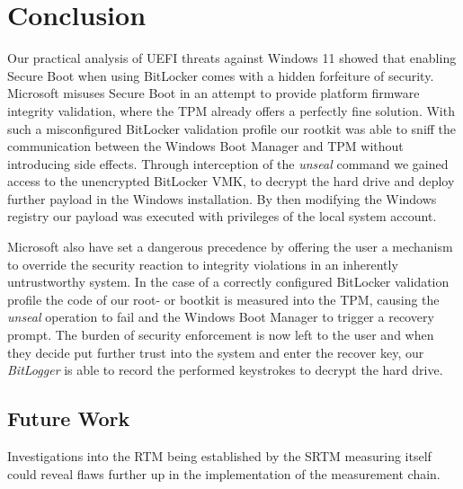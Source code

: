 
\chapter{Conclusion}

Our practical analysis of \ac{UEFI} threats against Windows 11 showed that enabling Secure Boot when using BitLocker comes with a hidden forfeiture of security.
Microsoft misuses Secure Boot in an attempt to provide platform firmware integrity validation, where the \ac{TPM} already offers a perfectly fine solution.
With such a misconfigured BitLocker validation profile our rootkit was able to sniff the communication between the Windows Boot Manager and \ac{TPM} without introducing side effects.
Through interception of the \emph{unseal} command we gained access to the unencrypted BitLocker \ac{VMK}, to decrypt the hard drive and deploy further payload in the Windows installation.
By then modifying the Windows registry our payload was executed with privileges of the local system account.

Microsoft also have set a dangerous precedence by offering the user a mechanism to override the security reaction to integrity violations in an inherently untrustworthy system.
In the case of a correctly configured BitLocker validation profile the code of our root- or bootkit is measured into the \ac{TPM}, causing the \emph{unseal} operation to fail and the Windows Boot Manager to trigger a recovery prompt.
The burden of security enforcement is now left to the user and when they decide put further trust into the system and enter the recover key, our \emph{BitLogger} is able to record the performed keystrokes to decrypt the hard drive.

\section*{Future Work}

Investigations into the \ac{RTM} being established by the \ac{SRTM} measuring itself could reveal flaws further up in the implementation of the measurement chain.